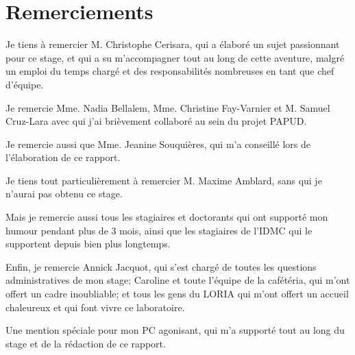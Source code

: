 \maketitle
	
	
\makesecondtitle

\section*{Remerciements}
\pagestyle{empty}
{
	Je tiens à remercier M. Christophe Cerisara, qui a élaboré un sujet passionnant pour ce stage, et qui a su m'accompagner tout au long de cette aventure, malgré un emploi du temps chargé et des responsabilités nombreuses en tant que chef d'équipe.
	
	Je remercie Mme. Nadia Bellalem, Mme. Christine Fay-Varnier et M. Samuel Cruz-Lara avec qui j'ai brièvement collaboré au sein du projet PAPUD.
	
	Je remercie aussi que Mme. Jeanine Souquières, qui m'a conseillé lors de l'élaboration de ce rapport.
	
	Je tiens tout particulièrement à remercier 
	M. Maxime Amblard, sans qui je n'aurai pas obtenu ce stage.
	
	Mais je remercie aussi tous les stagiaires et doctorants qui ont supporté mon humour pendant plus de 3 mois, ainsi que les stagiaires de l'IDMC qui le supportent depuis bien plus longtemps.
	
	Enfin, je remercie Annick Jacquot, qui s'est chargé de toutes les questions administratives de mon stage; Caroline et toute l'équipe de la cafétéria, qui m'ont offert un cadre inoubliable; et tous les gens du LORIA qui m'ont offert un accueil chaleureux et qui font vivre ce laboratoire.
	
	Une mention spéciale pour mon PC agonisant, qui m'a supporté tout au long du stage et de la rédaction de ce rapport.
}


